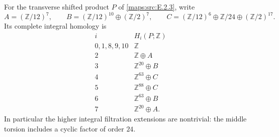 \begin{theorem}\hypertarget{tag-02MQ}{}\label{maps:src:E.2.6}


For the transverse shifted product $P$ of \ref{maps:src:E.2.3}, write
\[
 A=(\mathbb Z/12)^7,\qquad
 B=(\mathbb Z/12)^{10}\oplus(\mathbb Z/2)^7,\qquad
 C=(\mathbb Z/12)^6\oplus\mathbb Z/24\oplus(\mathbb Z/2)^{17}.
\]
Its complete integral homology is
\[
 \begin{array}{c|l}
 i&H_i(P;\mathbb Z)\\\hline
 0,1,8,9,10&\mathbb Z\\
 2&\mathbb Z\oplus A\\
 3&\mathbb Z^{20}\oplus B\\
 4&\mathbb Z^{63}\oplus C\\
 5&\mathbb Z^{88}\oplus C\\
 6&\mathbb Z^{63}\oplus B\\
 7&\mathbb Z^{20}\oplus A.
 \end{array}
\]
In particular the higher integral filtration extensions are nontrivial:
the middle torsion includes a cyclic factor of order $24$.
\end{theorem}


